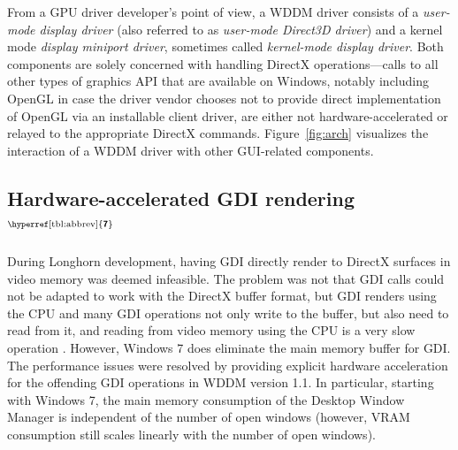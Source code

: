 \documentclass[10pt,twocolumn,a4paper]{article}
\newcommand{\bs}[1]{\textbf{\sffamily #1}}
\newcommand{\winver}[1]{$^{\text{\hyperref[tbl:abbrev]{\bs{#1}}}}$}
\newcommand{\winsubsection}[2]{\subsection[#1]{#1\winver{#2}}}
\begin{document}
			From a GPU driver developer's point of view, a WDDM driver consists
			of a \textit{user-mode display driver} (also referred to as
			\textit{user-mode Direct3D driver}) and a kernel mode
			\textit{display miniport driver}, sometimes called \textit{kernel-mode
			display driver}. Both components are solely concerned with handling
			DirectX operations---calls to all other types of graphics API that
			are available on Windows, notably including OpenGL in case the driver
			vendor chooses not to provide direct implementation of OpenGL via
			an installable client driver, are either not
			hardware-accelerated or relayed to the appropriate DirectX commands.
			Figure~\ref{fig:arch} visualizes the interaction of a WDDM driver with
			other GUI-related components.
			\cite{wddmarch,d2dvsgdi}

		\winsubsection{Hardware-accelerated GDI ren\-der\-ing}{7}
			During Longhorn development, having GDI directly render to DirectX
			surfaces in video memory was deemed infeasible. The problem
			was not that GDI calls
			could not be adapted to work with the DirectX buffer format, but
			GDI renders using the CPU and many GDI operations not only write to
			the buffer, but also need to read from it, and reading from video memory
			using the CPU is a very slow operation \cite{dwmredirect}. However,
			Windows 7 does eliminate the main memory buffer for GDI. The performance
			issues were resolved by providing explicit hardware acceleration for
			the offending GDI operations in WDDM version 1.1. In particular,
			starting with Windows 7, the
			main memory consumption of the Desktop Window Manager is independent
			of the number of open windows (however, VRAM consumption still scales
			linearly with the number of open windows).
			\cite{win7}

	\onecolumn{\printbibliography}
\end{document}
